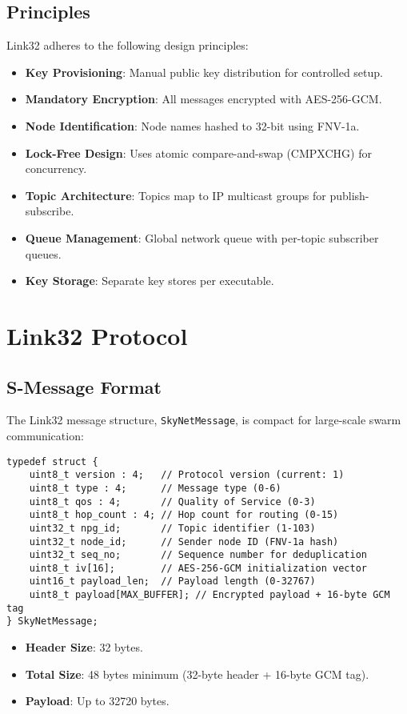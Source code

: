 \documentclass{article}
\begin{document}
\subsection{Principles}
Link32 adheres to the following design principles:
\begin{itemize}
    \item \textbf{Key Provisioning}: Manual public key distribution for controlled setup.
    \item \textbf{Mandatory Encryption}: All messages encrypted with AES-256-GCM.
    \item \textbf{Node Identification}: Node names hashed to 32-bit using FNV-1a.
    \item \textbf{Lock-Free Design}: Uses atomic compare-and-swap (CMPXCHG) for concurrency.
    \item \textbf{Topic Architecture}: Topics map to IP multicast groups for publish-subscribe.
    \item \textbf{Queue Management}: Global network queue with per-topic subscriber queues.
    \item \textbf{Key Storage}: Separate key stores per executable.
\end{itemize}

\section{Link32 Protocol}

\subsection{S-Message Format}
The Link32 message structure, \texttt{SkyNetMessage}, is compact for large-scale swarm communication:
\begin{lstlisting}
typedef struct {
    uint8_t version : 4;   // Protocol version (current: 1)
    uint8_t type : 4;      // Message type (0-6)
    uint8_t qos : 4;       // Quality of Service (0-3)
    uint8_t hop_count : 4; // Hop count for routing (0-15)
    uint32_t npg_id;       // Topic identifier (1-103)
    uint32_t node_id;      // Sender node ID (FNV-1a hash)
    uint32_t seq_no;       // Sequence number for deduplication
    uint8_t iv[16];        // AES-256-GCM initialization vector
    uint16_t payload_len;  // Payload length (0-32767)
    uint8_t payload[MAX_BUFFER]; // Encrypted payload + 16-byte GCM tag
} SkyNetMessage;
\end{lstlisting}
\begin{itemize}
    \item \textbf{Header Size}: 32 bytes.
    \item \textbf{Total Size}: 48 bytes minimum (32-byte header + 16-byte GCM tag).
    \item \textbf{Payload}: Up to 32720 bytes.
\end{itemize}
\end{document}
